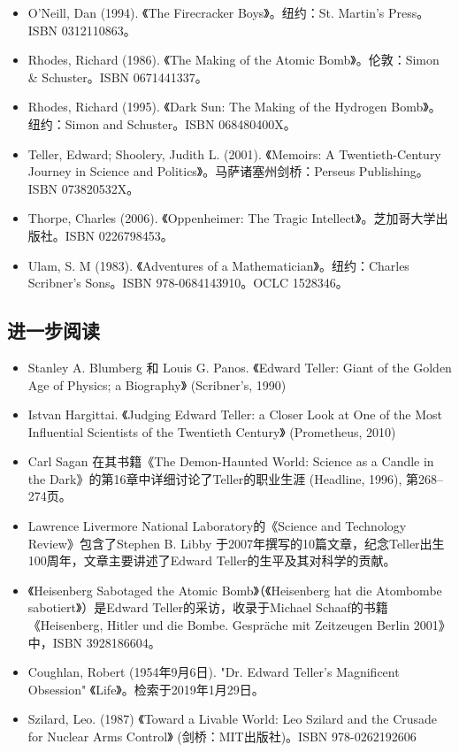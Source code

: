 \begin{itemize}
\item O'Neill, Dan (1994). 《The Firecracker Boys》。纽约：St. Martin's Press。ISBN 0312110863。
\item Rhodes, Richard (1986). 《The Making of the Atomic Bomb》。伦敦：Simon & Schuster。ISBN 0671441337。
\item Rhodes, Richard (1995). 《Dark Sun: The Making of the Hydrogen Bomb》。纽约：Simon and Schuster。ISBN 068480400X。
\item Teller, Edward; Shoolery, Judith L. (2001). 《Memoirs: A Twentieth-Century Journey in Science and Politics》。马萨诸塞州剑桥：Perseus Publishing。ISBN 073820532X。
\item Thorpe, Charles (2006). 《Oppenheimer: The Tragic Intellect》。芝加哥大学出版社。ISBN 0226798453。
\item Ulam, S. M (1983). 《Adventures of a Mathematician》。纽约：Charles Scribner's Sons。ISBN 978-0684143910。OCLC 1528346。
\end{itemize}
\subsection{进一步阅读}
\begin{itemize}
\item Stanley A. Blumberg 和 Louis G. Panos. 《Edward Teller: Giant of the Golden Age of Physics; a Biography》 (Scribner's, 1990)
\item Istvan Hargittai. 《Judging Edward Teller: a Closer Look at One of the Most Influential Scientists of the Twentieth Century》 (Prometheus, 2010)
\item Carl Sagan 在其书籍《The Demon-Haunted World: Science as a Candle in the Dark》的第16章中详细讨论了Teller的职业生涯 (Headline, 1996), 第268–274页。
\item Lawrence Livermore National Laboratory的《Science and Technology Review》包含了Stephen B. Libby 于2007年撰写的10篇文章，纪念Teller出生100周年，文章主要讲述了Edward Teller的生平及其对科学的贡献。
\item 《Heisenberg Sabotaged the Atomic Bomb》（《Heisenberg hat die Atombombe sabotiert》）是Edward Teller的采访，收录于Michael Schaaf的书籍《Heisenberg, Hitler und die Bombe. Gespräche mit Zeitzeugen Berlin 2001》中，ISBN 3928186604。
\item Coughlan, Robert (1954年9月6日). "Dr. Edward Teller's Magnificent Obsession" 《Life》。检索于2019年1月29日。
\item Szilard, Leo. (1987) 《Toward a Livable World: Leo Szilard and the Crusade for Nuclear Arms Control》 (剑桥：MIT出版社)。ISBN 978-0262192606
\end{itemize}
